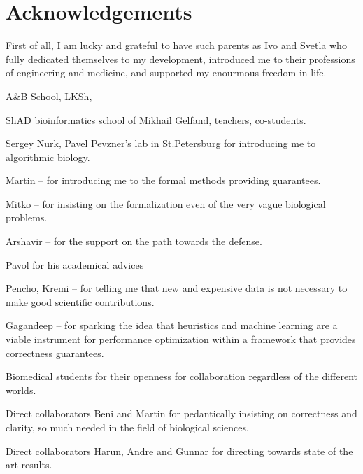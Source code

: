 
\bigskip

\begingroup
\let\clearpage\relax
\let\cleardoublepage\relax
\let\cleardoublepage\relax
\chapter*{Acknowledgements}

\def\thanks#1{%
\begingroup
\leftskip1em
\noindent #1
\par
\endgroup
}

First of all, I am lucky and grateful to have such parents as Ivo and Svetla who
fully dedicated themselves to my development, introduced me to their professions
of engineering and medicine, and supported my enourmous freedom in life.

A\&B School, LKSh,  

ShAD bioinformatics school of Mikhail Gelfand, teachers, co-students.

Sergey Nurk, Pavel Pevzner's lab in St.Petersburg for introducing me to
algorithmic biology.


Martin -- for introducing me to the formal methods providing guarantees.

Mitko -- for insisting on the formalization even of the very vague biological
problems.

Arshavir -- for the support on the path towards the defense.

Pavol for his academical advices

Pencho, Kremi -- for telling me that new and expensive data is not necessary to make
good scientific contributions.

Gagandeep -- for sparking the idea that heuristics and machine learning are a
viable instrument for performance optimization within a framework that provides
correctness guarantees.

Biomedical students for their openness for collaboration regardless of the
different worlds.

Direct collaborators Beni and Martin for pedantically insisting on correctness
and clarity, so much needed in the field of biological sciences.

Direct collaborators Harun, Andre and Gunnar for directing towards state of the art results.


